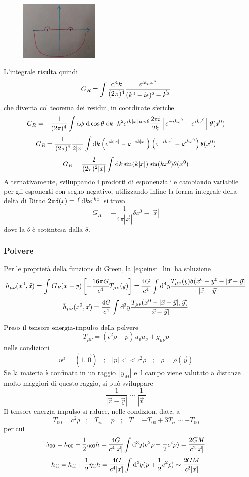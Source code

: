 \begin{figure}[htbp]
 \centering
 \includegraphics[angle=90, width=0.35\textwidth]{images/foglio5_circuito}
	\caption*{}
 \label{figure:green}
\end{figure}

L'integrale risulta quindi
\[ G_R = \int \frac{\mathrm{d} ^4k}{(2\pi)^4} \frac{e^{ik_\mu x^\mu}}{ (k^0+i\epsilon)^2 - \vec{k}^2 } \]
che diventa col teorema dei residui, in coordinate sferiche
\[ G_R = -\frac{1}{(2\pi)^4} \int \mathrm{d} \phi \; \mathrm{d} \cos\theta \;\mathrm{d} k \;\; k^2 e^{ ik|x|\cos\theta} \frac{2\pi i}{2k} \left[e^{-ikx^0} - e^{ikx^0}\right] \theta(x^0)    \]
\[ G_R = \frac{1}{(2\pi)^2} \frac{1}{2|x|} \int \mathrm{d} k \left( e^{ik|x|} - e^{-ik|x|}\right) \left(e^{-ikx^0} - e^{ikx^0} \right)\theta(x^0)  \]
\[ G_R = \frac{2}{(2\pi)^2 |x|} \int \mathrm{d} k \sin(k|x|) \sin(kx^0) \theta(x^0) \]
Alternativamente, sviluppando i prodotti di esponenziali e cambiando variabile per gli esponenti con segno negativo, utilizzando infine la forma integrale della delta di Dirac \( 2\pi\delta(x) = \int \mathrm{d} k e^{ikx} \) si trova
\[ G_R = -\frac{1}{4\pi|\vec{x}|}\delta{x^0-|\vec{x}|} \]
dove la $\theta$ \`e sottintesa dalla $\delta$.

\subsubsection{Polvere}
Per le propriet\`a della funzione di Green, la \ref{eq:einst_lin} ha soluzione
\[ \bar{h}_{\mu\nu} (x^0,\vec{x}) = \int G_R(x-y) \left[ -\frac{16\pi G}{c^4} T_{\mu\nu}(y) \right] 
		= \frac{4G}{c^4} \int \mathrm{d} ^4y \frac{ T_{\mu\nu}(y) \delta(x^0-y^0-|\vec{x}- \vec{y}|}{|\vec{x}-\vec{y}|} \]
\[ \bar{h}_{\mu\nu} (x^0,\vec{x}) = \frac{4G}{c^4} \int \mathrm{d} ^3y \frac{ T_{\mu\nu}(x^0-|\vec{x}-\vec{y}|, \vec{y})}{|\vec{x}-\vec{y}|} \]

Preso il tensore energia-impulso della polvere
\[ T_{\mu\nu} = (c^2 \rho +p)u_\mu u_\nu + g_{\mu\nu} p \]
nelle condizioni 
\[ u^\mu = (1,\vec{0}) \;\;\; ; \;\;\; |p| << c^2\rho \;\;\; ; \;\;\; \rho = \rho(\vec{y}) \]
Se la materia \`e confinata in un raggio $|\vec{y}_M|$ e il campo viene valutato a distanze molto maggiori di questo raggio, si pu\`o sviluppare
\[ \frac{1}{|\vec{x}-\vec{y}|} \sim \frac{1}{|\vec{x}|} \]
Il tensore energia-impulso si riduce, nelle condizioni date, a
\[ T_{00} = c^2\rho \;\;\; ; \;\;\; T_{ii} = p  \;\;\; ; \;\;\; T = -T_{00} +3 T_{ii} \sim -T_{00} \]
per cui
\[ h_{00} = \bar{h}_{00} + \frac{1}{2} \eta_{00} h = \frac{4G}{c^4|\vec{x}|} \int \mathrm{d}^3y (c^2\rho - \frac{1}{2}c^2\rho) = \frac{2GM}{c^2|\vec{x}|} \]
\[ h_{ii} = \bar{h}_{ii} + \frac{1}{2} \eta_{ii} h = \frac{4G}{c^4|\vec{x}|} \int \mathrm{d}^3y (p + \frac{1}{2}c^2\rho) \sim \frac{2GM}{c^2|\vec{x}|} \]

